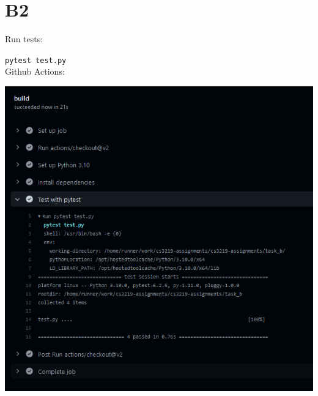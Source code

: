 \documentclass{article}
\begin{document}
    \section*{B2}
    Run tests:

    \texttt{pytest test.py}\\

    Github Actions:

    \includegraphics[width=\textwidth]{img/ci.png}\\
\end{document}
